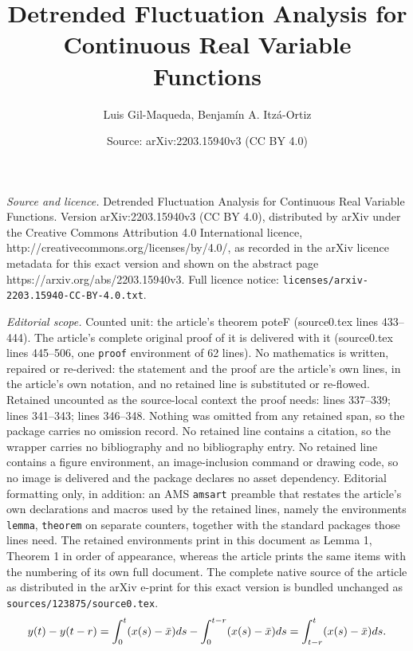 \documentclass[10pt,a4paper]{amsart}
\title{Detrended Fluctuation Analysis for Continuous Real Variable Functions}
\author{Luis Gil-Maqueda, Benjam\'in A. Itz\'a-Ortiz}
\date{Source: arXiv:2203.15940v3 (CC BY 4.0)}
\begin{document}
\maketitle

\noindent\emph{Source and licence.} Detrended Fluctuation Analysis for Continuous Real Variable Functions. Version arXiv:2203.15940v3 (CC BY 4.0), distributed by arXiv under the Creative Commons Attribution 4.0 International licence, http://creativecommons.org/licenses/by/4.0/, as recorded in the arXiv licence metadata for this exact version and shown on the abstract page https://arxiv.org/abs/2203.15940v3. Full licence notice: \texttt{licenses/arxiv-2203.15940-CC-BY-4.0.txt}.\par\smallskip

\noindent\textit{Editorial scope.} Counted unit: the article's theorem poteF (source0.tex lines 433--444). The article's complete original proof of it is delivered with it (source0.tex lines 445--506, one \texttt{proof} environment of 62 lines). No mathematics is written, repaired or re-derived: the statement and the proof are the article's own lines, in the article's own notation, and no retained line is substituted or re-flowed.  Retained uncounted as the source-local context the proof needs: lines 337--339; lines 341--343; lines 346--348.  Nothing was omitted from any retained span, so the package carries no omission record.  No retained line contains a citation, so the wrapper carries no bibliography and no bibliography entry.  No retained line contains a figure environment, an image-inclusion command or drawing code, so no image is delivered and the package declares no asset dependency.  Editorial formatting only, in addition: an AMS \texttt{amsart} preamble that restates the article's own declarations and macros used by the retained lines, namely the environments \texttt{lemma}, \texttt{theorem} on separate counters, together with the standard packages those lines need.  The retained environments print in this document as Lemma 1, Theorem 1 in order of appearance, whereas the article prints the same items with the numbering of its own full document.  The complete native source of the article as distributed in the arXiv e-print for this exact version is bundled unchanged as \texttt{sources/123875/source0.tex}.
\begin{equation}\label{TR}
     y(t)-y(t-r) = \int_{0}^{t} (x(s)-\Bar{x} ) ds - \int_{0}^{t-r} (x(s)-\Bar{x} ) ds = \int_{t-r}^{t} (x(s)-\Bar{x} ) ds.
\end{equation}
\end{document}
